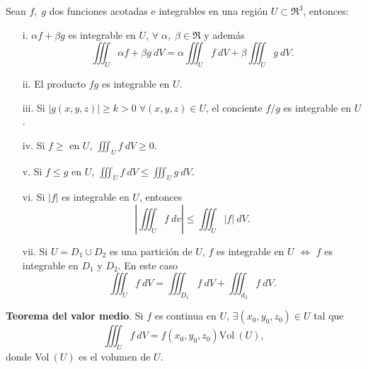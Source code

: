 \begin{propertie}
    Sean $f,\;g$ dos funciones acotadas e integrables en una regi\'on $U\subset\Re^3$, entonces:
    \begin{enumerate}
        \item[i.] $\alpha f+\beta g$ es integrable en $U$, $\forall\;\alpha,\;\beta\in\Re$ y adem\'as
        \[
            \iiint_U \alpha f+\beta g\:dV=\alpha\iiint_U f\:dV+\beta\iiint_U g\:dV.
        \]
        \item[ii.] El producto $fg$ es integrable en $U$.
        \item[iii.] Si $|g(x,y,z)|\geq k>0\;\forall(x,y,z)\in U$, el conciente $f/g$ es integrable en $U$.
        \item[iv.] Si $f\geq$ en $U$, $\iiint_U f\:dV\geq0$.
        \item[v.]Si $f\leq g$ en $U$, $\iiint_U f\:dV\leq\iiint_U g\:dV.$
        \item[vi.]Si $|f|$ es integrable en $U$, entonces 
        \[
            \left|\iiint_U f\:dv\right|\leq\iiint_U|f|\:dV.  
        \]    
        \item[vii.] Si $U=D_1\cup D_2$ es una partici\'on de $U$, $f$ es integrable en $U$ $\iff$ $f$ es integrable en $D_1$ y $D_2$. En este caso 
        \[
            \iiint_U f\:dV=\iiint_{D_1} f\:dV+\iiint_{d_2}f\:dV.    
        \]
    \end{enumerate}
\end{propertie}

\begin{theorem}
    \textbf{Teorema del valor medio}. Si $f$ es continua en $U$, $\exists(x_0,y_0,z_0)\in U$ tal que 
    \[
        \iiint_U f\:dV=f(x_0,y_0,z_0)\text{Vol}\:(U),
    \]
    donde Vol$\:(U)$ es el volumen de $U$. 
\end{theorem}

